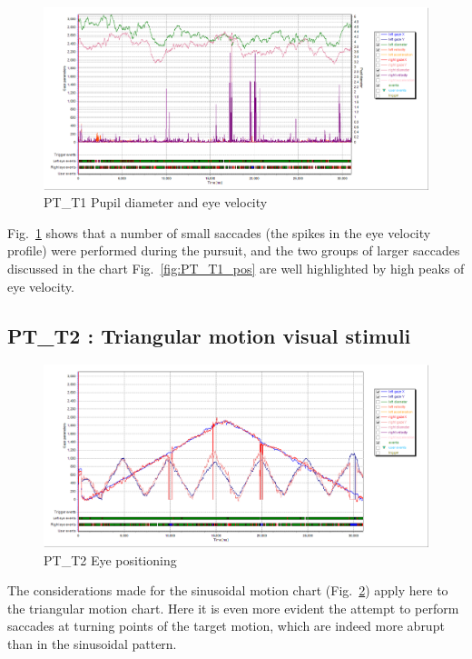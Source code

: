 \begin{figure}[t]
  \centering
  \includegraphics[width=.8\textwidth]{figures/graphs/PT_T1(sinusoid)_VP.png}
  \caption[PT\_T1 Pupil size and velocity profile]{PT\_T1 Pupil diameter and eye velocity}
  \label{fig:PT_T1_vel}
\end{figure}

Fig.~\ref{fig:PT_T1_vel} shows that a number of small saccades (the spikes in the eye velocity profile) were performed during the pursuit, and the two groups of larger saccades discussed in the chart Fig.~\ref{fig:PT_T1_pos} are well highlighted by high peaks of eye velocity.



\subsection{PT\_T2 : Triangular motion visual stimuli}
\label{sec:PT_T2}

\begin{figure}[h]
  \centering
  \includegraphics[width=.8\textwidth]{figures/graphs/PT_T2(triangular)_XY.png}
  \caption[PT\_T2 Eye positioning]{PT\_T2 Eye positioning}
  \label{fig:PT_T2_pos}
\end{figure}

The considerations made for the sinusoidal motion chart (Fig.~\ref{fig:PT_T2_pos}) apply here to the triangular motion chart. Here it is even more evident the attempt to perform saccades at turning points of the target motion, which are indeed more abrupt than in the sinusoidal pattern.

